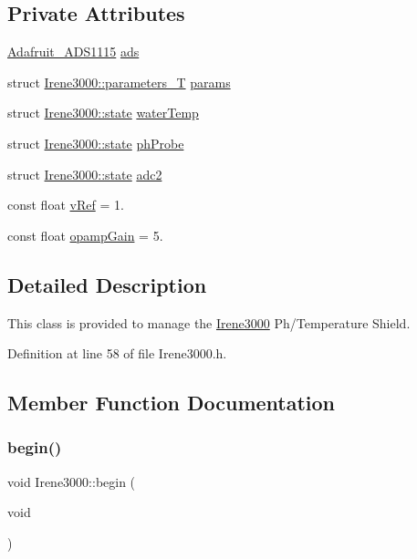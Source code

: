 \subsection*{Private Attributes}
\begin{DoxyCompactItemize}
\item 
\hyperlink{class_adafruit___a_d_s1115}{Adafruit\+\_\+\+A\+D\+S1115} \hyperlink{class_irene3000_a1215e77ba761c9908d80d691f149e135}{ads}
\item 
struct \hyperlink{struct_irene3000_1_1parameters___t}{Irene3000\+::parameters\+\_\+T} \hyperlink{class_irene3000_a136585a5ee7f9ac6ab52175fa153f8e3}{params}
\item 
struct \hyperlink{struct_irene3000_1_1state}{Irene3000\+::state} \hyperlink{class_irene3000_af05612c78c758ce9db316c75ad937130}{water\+Temp}
\item 
struct \hyperlink{struct_irene3000_1_1state}{Irene3000\+::state} \hyperlink{class_irene3000_a997a4ee466fa1d5416e07e444965dc9e}{ph\+Probe}
\item 
struct \hyperlink{struct_irene3000_1_1state}{Irene3000\+::state} \hyperlink{class_irene3000_aae3a95a1c83c766cd2f299ce471c337e}{adc2}
\item 
const float \hyperlink{class_irene3000_a018e7ff9bee57e6d2b298667a668ba7e}{v\+Ref} = 1.
\item 
const float \hyperlink{class_irene3000_a4e588985ca74e5076029d5dee81034f2}{opamp\+Gain} = 5.
\end{DoxyCompactItemize}


\subsection{Detailed Description}
This class is provided to manage the \hyperlink{class_irene3000}{Irene3000} Ph/\+Temperature Shield. 

Definition at line 58 of file Irene3000.\+h.



\subsection{Member Function Documentation}
\mbox{\label{class_irene3000_ad5891806c500ae1007afe52b9e304c2b}} 
\subsubsection{\texorpdfstring{begin()}{begin()}}
{\footnotesize\ttfamily void Irene3000\+::begin (\begin{DoxyParamCaption}\item[{void}]{ }\end{DoxyParamCaption})}

